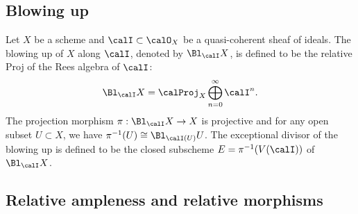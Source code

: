 \subsection{Blowing up}

    \begin{definition}\label{def:blowing_up}
        Let \(X\) be a scheme and \(\calI \subset \calO_X\) be a quasi-coherent sheaf of ideals.
        The blowing up of \(X\) along \(\calI\), denoted by \(\Bl_\calI X\), is defined to be the relative Proj of the Rees algebra of \(\calI\):
        \[
            \Bl_\calI X = \calProj_X \bigoplus_{n=0}^\infty \calI^n.
        \]
        The projection morphism \(\pi : \Bl_\calI X \to X\) is projective and for any open subset \(U \subset X\), we have \(\pi^{-1}(U) \cong \Bl_{\calI(U)} U\).
        The exceptional divisor of the blowing up is defined to be the closed subscheme \(E = \pi^{-1}(V(\calI))\) of \(\Bl_\calI X\).
    \end{definition}

\subsection{Relative ampleness and relative morphisms}


